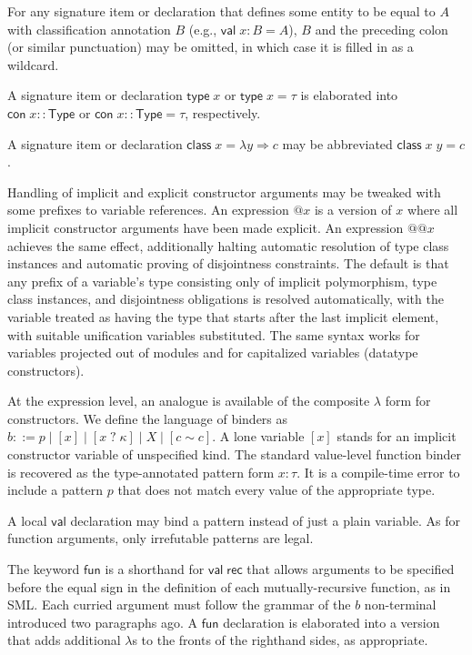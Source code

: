 \documentclass{article}
\newcommand{\mt}[1]{\mathsf{#1}}
\begin{document}
For any signature item or declaration that defines some entity to be equal to $A$ with classification annotation $B$ (e.g., $\mt{val} \; x : B = A$), $B$ and the preceding colon (or similar punctuation) may be omitted, in which case it is filled in as a wildcard.

A signature item or declaration $\mt{type} \; x$ or $\mt{type} \; x = \tau$ is elaborated into $\mt{con} \; x :: \mt{Type}$ or $\mt{con} \; x :: \mt{Type} = \tau$, respectively.

A signature item or declaration $\mt{class} \; x = \lambda y \Rightarrow c$ may be abbreviated $\mt{class} \; x \; y = c$.

Handling of implicit and explicit constructor arguments may be tweaked with some prefixes to variable references.  An expression $@x$ is a version of $x$ where all implicit constructor arguments have been made explicit.  An expression $@@x$ achieves the same effect, additionally halting automatic resolution of type class instances and automatic proving of disjointness constraints.  The default is that any prefix of a variable's type consisting only of implicit polymorphism, type class instances, and disjointness obligations is resolved automatically, with the variable treated as having the type that starts after the last implicit element, with suitable unification variables substituted.  The same syntax works for variables projected out of modules and for capitalized variables (datatype constructors).

At the expression level, an analogue is available of the composite $\lambda$ form for constructors.  We define the language of binders as $b ::= p \mid [x] \mid [x \; ? \; \kappa] \mid X \mid [c \sim c]$.  A lone variable $[x]$ stands for an implicit constructor variable of unspecified kind.  The standard value-level function binder is recovered as the type-annotated pattern form $x : \tau$.  It is a compile-time error to include a pattern $p$ that does not match every value of the appropriate type.

A local $\mt{val}$ declaration may bind a pattern instead of just a plain variable.  As for function arguments, only irrefutable patterns are legal.

The keyword $\mt{fun}$ is a shorthand for $\mt{val} \; \mt{rec}$ that allows arguments to be specified before the equal sign in the definition of each mutually-recursive function, as in SML.  Each curried argument must follow the grammar of the $b$ non-terminal introduced two paragraphs ago.  A $\mt{fun}$ declaration is elaborated into a version that adds additional $\lambda$s to the fronts of the righthand sides, as appropriate.
\end{document}
